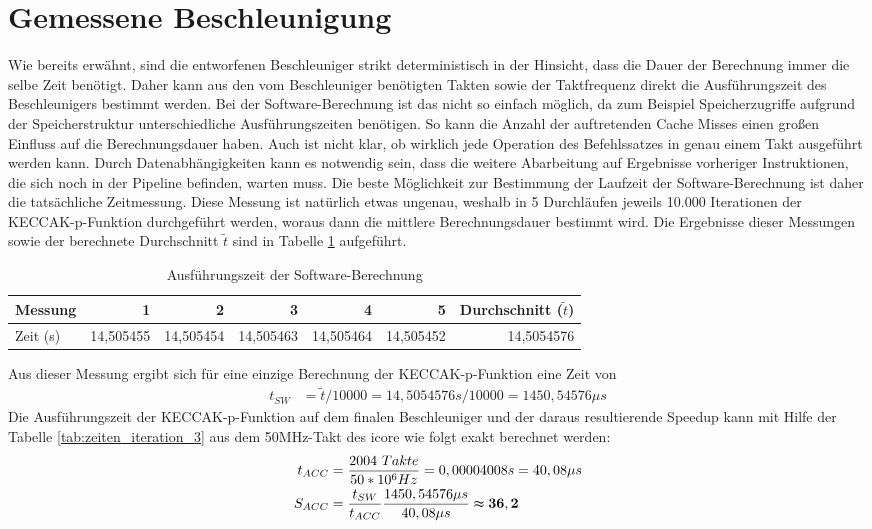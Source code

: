 \section{Gemessene Beschleunigung}
Wie bereits erwähnt, sind die entworfenen Beschleuniger strikt deterministisch in der Hinsicht, dass die Dauer der Berechnung immer die selbe Zeit benötigt.
Daher kann aus den vom Beschleuniger benötigten Takten sowie der Taktfrequenz direkt die Ausführungszeit des Beschleunigers bestimmt werden.
Bei der Software-Berechnung ist das nicht so einfach möglich, da zum Beispiel Speicherzugriffe aufgrund der Speicherstruktur unterschiedliche Ausführungszeiten benötigen.
So kann die Anzahl der auftretenden Cache Misses einen großen Einfluss auf die Berechnungsdauer haben. Auch ist nicht klar, ob wirklich jede Operation des Befehlssatzes
in genau einem Takt ausgeführt werden kann. Durch Datenabhängigkeiten kann es notwendig sein, dass die weitere Abarbeitung auf Ergebnisse vorheriger Instruktionen,
die sich noch in der Pipeline befinden, warten muss. Die beste Möglichkeit zur Bestimmung der Laufzeit der Software-Berechnung ist daher die tatsächliche Zeitmessung.
Diese Messung ist natürlich etwas ungenau, weshalb in 5 Durchläufen jeweils 10.000 Iterationen der KECCAK-p-Funktion durchgeführt werden, woraus dann die mittlere Berechnungsdauer bestimmt wird.
Die Ergebnisse dieser Messungen sowie der berechnete Durchschnitt $\tilde{t}$ sind in Tabelle \ref{tab:software_zeitmessung} aufgeführt.
\begin{table}
    \centering
    \begin{tabular}{lrrrrrr}
        Messung & 1 & 2 & 3 & 4 & 5 & Durchschnitt ($\tilde{t}$)\\
        \hline
        Zeit (s) & 14,505455 & 14,505454 & 14,505463 & 14,505464 & 14,505452 & 14,5054576
    \end{tabular}
    \label{tab:software_zeitmessung}
    \caption{Ausführungszeit der Software-Berechnung}
\end{table}
Aus dieser Messung ergibt sich für eine einzige Berechnung der KECCAK-p-Funktion eine Zeit von
\begin{align*}
    t_{SW} & = \tilde{t}/10000 = 14,5054576 s / 10000 = 1450,54576 \mu s
\end{align*}
Die Ausführungszeit der KECCAK-p-Funktion auf dem finalen Beschleuniger und der daraus resultierende Speedup kann
mit Hilfe der Tabelle \ref{tab:zeiten_iteration_3} aus dem 50MHz-Takt des icore wie folgt exakt berechnet werden:
\begin{align*}
    t_{ACC} & = \frac{2004\ Takte}{50 * 10^6Hz} = 0,00004008s = 40,08 \mu s \\
    S_{ACC} & = \frac{t_{SW}}{t_{ACC}}\frac{1450,54576 \mu s}{40,08 \mu s} \thickapprox \mathbf{36,2}
\end{align*}

